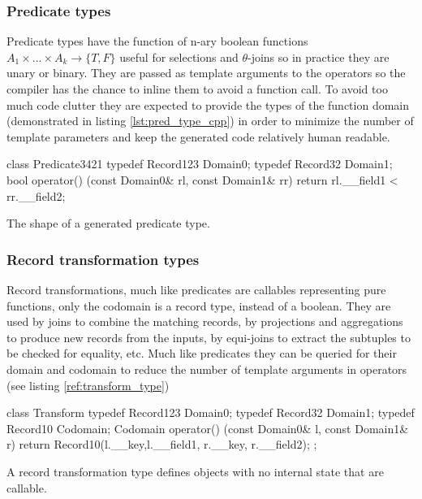 \subsubsection{Predicate types}

Predicate types have the function of n-ary boolean functions \(A_1
\times ... \times A_k \to \{T,F\}\) useful for selections and
\(\theta\)-joins so in practice they are unary or binary. They are
passed as template arguments to the operators so the compiler has the
chance to inline them to avoid a function call. To avoid too much code
clutter they are expected to provide the types of the function domain
(demonstrated in listing \ref{lst:pred_type_cpp}) in order to minimize
the number of template parameters and keep the generated code
relatively human readable.

\begin{code}
\begin{cppcode}
class Predicate3421 {
  typedef Record123 Domain0;
  typedef Record32 Domain1;
  bool operator() (const Domain0& rl, const Domain1& rr) {
    return rl.__field1 < rr.__field2;
  }
}
\end{cppcode}
\caption{\label{lst:pred_type_cpp}The shape of a generated predicate type.}
\end{code}

\subsubsection{Record transformation types}

Record transformations, much like predicates are callables
representing pure functions, only the codomain is a record type,
instead of a boolean. They are used by joins to combine the matching
records, by projections and aggregations to produce new records from
the inputs, by equi-joins to extract the subtuples to be checked for
equality, etc. Much like predicates they can be queried for their
domain and codomain to reduce the number of template arguments in
operators (see listing \ref{ref:transform_type})

\begin{code}
\begin{cppcode}
class Transform {
  typedef Record123 Domain0;
  typedef Record32 Domain1;
  typedef Record10 Codomain;
  Codomain operator() (const Domain0& l, const Domain1& r) {
    return Record10(l.__key,l.__field1, r.__key, r.__field2);
  }
};
\end{cppcode}
  \caption{\label{ref:transform_type}A record transformation type
    defines objects with no internal state that are callable.}
\end{code}


